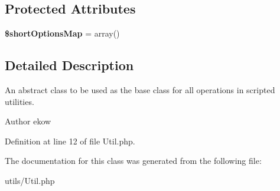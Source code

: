 \subsection*{Protected Attributes}
\begin{DoxyCompactItemize}
\item 
\hypertarget{class_util_a4bd4a50e05b3f8c5825117bef813ac8f}{
{\bfseries \$shortOptionsMap} = array()}
\label{class_util_a4bd4a50e05b3f8c5825117bef813ac8f}

\end{DoxyCompactItemize}


\subsection{Detailed Description}
An abstract class to be used as the base class for all operations in scripted utilities. \begin{DoxyAuthor}{Author}
ekow 
\end{DoxyAuthor}


Definition at line 12 of file Util.php.



The documentation for this class was generated from the following file:\begin{DoxyCompactItemize}
\item 
utils/Util.php\end{DoxyCompactItemize}
